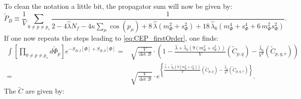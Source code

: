 To clean the notation a little bit, the propagator sum will now be given by:
\begin{equation}\label{eq:bosonicPropagatorSum_CEP_withDetAndLambda6}
 \tilde P_B \equiv \frac{1}{V}\sum\limits_{0\neq p\neq p_s} \frac{1}{2 - 4 \hat\lambda N_f - 4 \kappa \sum_{\mu} \cos(p_{\mu}) 
                   + 8\,  \hat\lambda \left( m_{\Phi}^2 + s_{\Phi}^2  \right) 
                   + 18\, \hat\lambda_6\left( m_{\Phi}^4 + s_{\Phi}^4 + 6\,  m_{\Phi}^2 s_{\Phi}^2 \right)}.
\end{equation}
If one now repeats the steps leading to \eqref{eq:CEP_firstOrder}, one finds:
\begin{align}\label{eq:CEP_firstOrder_withDetAndLambda6}
 \int \left[ \prod\limits_{0 \neq p \neq p_s}  d \tilde \Phi_p \right]   
                      e^{-S_{B,I}[\Phi] +  S_{B,0}[\Phi]} 
                      = & \sqrt{\frac{V}{\det \mathcal{B}}} \cdot 
                        \left(1 - \frac{\hat\lambda + \hat\lambda_6\left( 9\left( m_{\Phi}^2 + s_{\Phi}^2 \right) \right)}{V}\left( \tilde C_{p,q} \right) 
                        - \frac{\hat\lambda_6}{V^2} \left( \tilde C_{p,q,r} \right) \right)
          \nonumber \\
                      = & \sqrt{\frac{V}{\det \mathcal{B}}} 
                        \cdot e^{\left\{ \frac{\hat\lambda + \hat\lambda_6\left( 9\left( m_{\Phi}^2 + s_{\Phi}^2 \right) \right)}{V}\left( \tilde C_{p,q} \right) 
                        - \frac{\hat\lambda_6}{V^2} \left( \tilde C_{p,q,r} \right) \right\} }.
\end{align}
The $\tilde C$ are given by:
